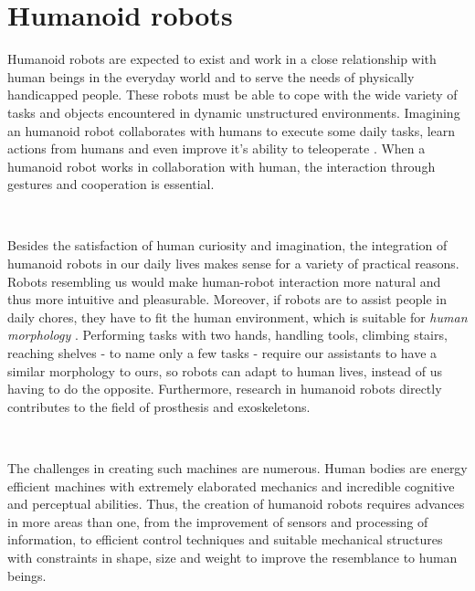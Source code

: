 \section{Humanoid robots}

Humanoid robots are expected to exist and work in a close relationship with human beings in the everyday world and 
to serve the needs of physically handicapped people. These robots must be able to cope with the wide variety of tasks
and objects encountered in dynamic unstructured environments. Imagining an humanoid robot collaborates with humans 
to execute some daily tasks, learn actions from humans and even improve it's ability to teleoperate \cite{FUKAYA2001273}.
When a humanoid robot works in collaboration with human, the interaction through gestures and cooperation is essential. 

~

Besides the satisfaction of human curiosity and imagination, the integration of humanoid robots in our daily lives makes
sense for a variety of practical reasons. Robots resembling us would make human-robot interaction more natural and thus
more intuitive and pleasurable. Moreover, if robots are to assist people in daily chores, they have to fit the human 
environment, which is suitable for \textit{human morphology} \cite{Kemp2008}. Performing tasks with two hands, handling
tools, climbing stairs, reaching shelves - to name only a few tasks - require our assistants to have a similar 
morphology to ours, so robots can adapt to human lives, instead of us having to do the opposite. Furthermore, 
research in humanoid robots directly contributes to the field of prosthesis and exoskeletons.

~

The challenges in creating such machines are numerous. Human bodies are energy efficient machines with extremely elaborated 
mechanics and incredible cognitive and perceptual abilities. Thus, the creation of humanoid robots requires advances in 
more areas than one, from the improvement of sensors and processing of information, to efficient control techniques and 
suitable mechanical structures with constraints in shape, size and weight to improve the resemblance to human beings.

~

